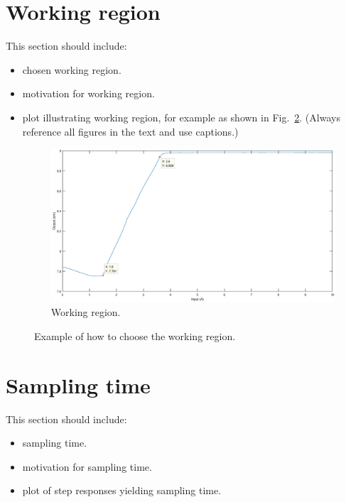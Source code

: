 \documentclass[10pt,a4paper]{article}
\begin{document}
\section{Working region}
This section should include:
\begin{itemize}
    \item chosen working region.
    \item motivation for working region.
    \item plot illustrating working region, for example as shown in Fig.~\ref{fig:workingRegion}. (Always reference all figures in the text and use captions.)
    \begin{figure}[ht]
		\footnotesize
		\centering 
		\includegraphics[width=\columnwidth]{workingRegion.eps} 
		\caption{Working region.}
		\label{fig:workingRegion}
	\end{figure}
\end{itemize}
%
\begin{figure}[ht]
	\footnotesize
	\centering 
	\def\svgwidth{.8\columnwidth}
	 
	\caption{Example of how to choose the working region.}
	\label{fig:workingRegion}
	\end{figure}

\section{Sampling time}
This section should include:
\begin{itemize}
    \item sampling time.
    \item motivation for sampling time.
    \item plot of step responses yielding sampling time.
\end{itemize}
\end{document}
